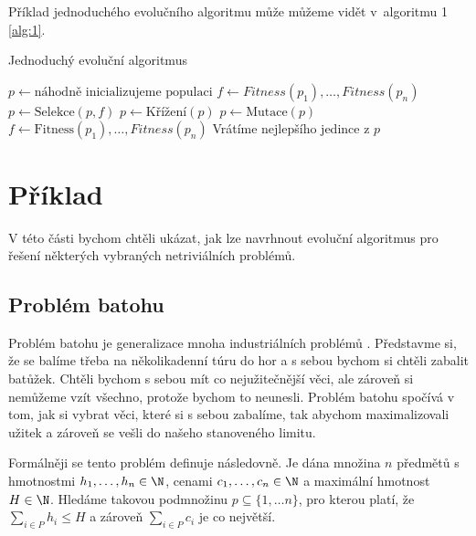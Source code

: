 Příklad jednoduchého evolučního algoritmu může můžeme vidět v~algoritmu 1 \ref{alg:1}.

\begin{algorithm}
\caption{Jednoduchý evoluční algoritmus}
\begin{algorithmic}[1] 
	\State $p \gets \mbox{náhodně inicializujeme populaci}$
    \State $f \gets Fitness(p_1), \dots, Fitness(p_n)$ 
		\State $p \gets \mbox{Selekce}(p, f)$
		\State $p \gets \mbox{Křížení}(p)$
		\State $p \gets \mbox{Mutace}(p)$
        \State $f \gets \mbox{Fitness}(p_1), \dots, Fitness(p_n)$
    \EndWhile
    \State Vrátíme nejlepšího jedince z $p$
\EndFunction
\label{alg:1}
\end{algorithmic}
\end{algorithm}


\section{Příklad}

V této části bychom chtěli ukázat, jak lze navrhnout evoluční algoritmus pro řešení některých vybraných netriviálních problémů.

\subsection{Problém batohu} \label{batoh}

Problém batohu je generalizace mnoha industriálních problémů \cite{EibenSmith2015}. Představme si, že se balíme třeba na několikadenní túru do hor a s sebou bychom si chtěli zabalit batůžek. Chtěli bychom s sebou mít co nejužitečnější věci, ale zároveň si nemůžeme vzít všechno, protože bychom to neunesli. Problém batohu spočívá v tom, jak si vybrat věci, které si s sebou zabalíme, tak abychom maximalizovali užitek a zároveň se vešli do našeho stanoveného limitu.

Formálněji se tento problém definuje následovně. Je dána množina $n$ předmětů s hmotnostmi $h_1, \dots, h_n \in \N$, cenami $c_1, \dots, c_n \in \N$ a maximální hmotnost $H \in \N$. Hledáme takovou podmnožinu $p \subseteq \{1, \dots n\}$, pro kterou platí, že $\sum_{i \in P} h_i \leq H$ a zároveň $\sum_{i \in P} c_i$ je co největší.

